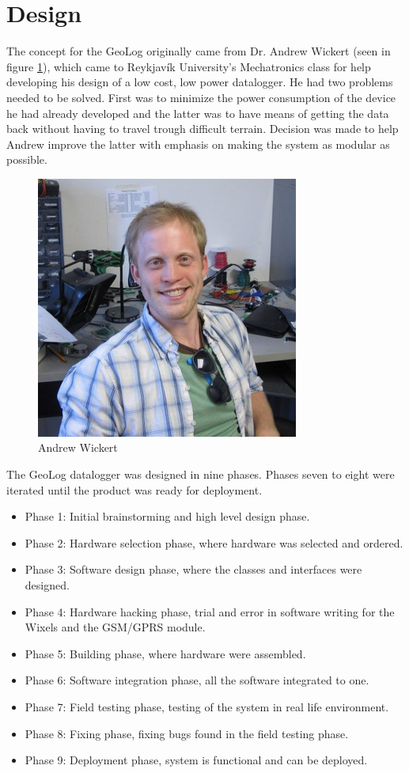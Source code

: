 \section{Design}
The concept for the GeoLog originally came from Dr. Andrew Wickert (seen in figure 
\ref{fig:andrewWickert}), which came to Reykjavík University's Mechatronics class for 
help developing his design of a low cost, low power datalogger\cite{ALog-BottleLogger}. 
He had two problems needed to be solved. First was to minimize the power consumption of the device he had already developed and the latter was to have means of getting the data
back without having to travel trough difficult terrain. Decision was made to help Andrew 
improve the latter with emphasis on making the system as modular as possible. 

\begin{figure}
\centering
\includegraphics[width=0.4\linewidth]{graphics/andrewWickert}
\caption{Andrew Wickert\label{fig:andrewWickert}\cite{andrewWickert}}
\end{figure}

The GeoLog datalogger was designed in nine phases. Phases seven to eight were iterated
until the product was ready for deployment.

\begin{itemize}
	\item{Phase 1:} Initial brainstorming and high level design phase.
	\item{Phase 2:} Hardware selection phase, where hardware was selected and ordered.
	\item{Phase 3:} Software design phase, where the classes and interfaces were designed.
	\item{Phase 4:} Hardware hacking phase, trial and error in software writing for the
					Wixels\cite{wixel} and the GSM/GPRS module\cite{SM5100B}.
	\item{Phase 5:} Building phase, where hardware were assembled.
	\item{Phase 6:} Software integration phase, all the software integrated to one.
	\item{Phase 7:} Field testing phase, testing of the system in real life environment.
	\item{Phase 8:} Fixing phase, fixing bugs found in the field testing phase.
	\item{Phase 9:} Deployment phase, system is functional and can be deployed. 
\end{itemize}

